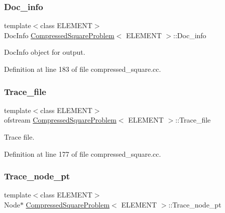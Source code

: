 \subsubsection{\texorpdfstring{Doc\+\_\+info}{Doc\_info}}
{\footnotesize\ttfamily template$<$class E\+L\+E\+M\+E\+NT$>$ \\
Doc\+Info \hyperlink{classCompressedSquareProblem}{Compressed\+Square\+Problem}$<$ E\+L\+E\+M\+E\+NT $>$\+::Doc\+\_\+info\hspace{0.3cm}{\ttfamily [private]}}



Doc\+Info object for output. 



Definition at line 183 of file compressed\+\_\+square.\+cc.

\mbox{\label{classCompressedSquareProblem_afc8bc8ff7811d18f8d59cd1c35e6cb00}} 
\subsubsection{\texorpdfstring{Trace\+\_\+file}{Trace\_file}}
{\footnotesize\ttfamily template$<$class E\+L\+E\+M\+E\+NT$>$ \\
ofstream \hyperlink{classCompressedSquareProblem}{Compressed\+Square\+Problem}$<$ E\+L\+E\+M\+E\+NT $>$\+::Trace\+\_\+file\hspace{0.3cm}{\ttfamily [private]}}



Trace file. 



Definition at line 177 of file compressed\+\_\+square.\+cc.

\mbox{\label{classCompressedSquareProblem_a0af6b1044a8392a3ae3d753f4db52664}} 
\subsubsection{\texorpdfstring{Trace\+\_\+node\+\_\+pt}{Trace\_node\_pt}}
{\footnotesize\ttfamily template$<$class E\+L\+E\+M\+E\+NT$>$ \\
Node$\ast$ \hyperlink{classCompressedSquareProblem}{Compressed\+Square\+Problem}$<$ E\+L\+E\+M\+E\+NT $>$\+::Trace\+\_\+node\+\_\+pt\hspace{0.3cm}{\ttfamily [private]}}



